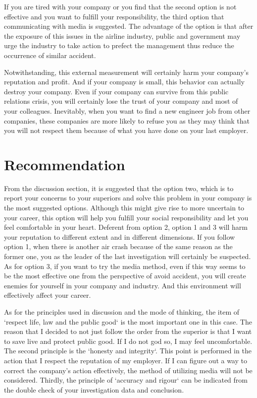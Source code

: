 \documentclass[11pt, a4paper]{article}
\begin{document}
If you are tired with your company or you find that the second option is not effective and you want to fulfill your responsibility, the third option that communicating with media is suggested. The advantage of the option is that after the exposure of this issues in the airline industry, public and government may urge the industry to take action to prefect the management thus reduce the occurrence of similar accident. 

Notwithstanding, this external measurement will certainly harm your company's reputation and profit. And if your company is small, this behavior can actually destroy your company. Even if your company can survive from this public relations crisis, you will certainly lose the trust of your company and most of your colleagues. Inevitably, when you want to find a new engineer job from other companies, these companies are more likely to refuse you as they may think that you will not respect them because of what you have done on your last employer.

\section{Recommendation}

From the discussion section, it is suggested that the option two, which is to report your concerns to your superiors and solve this problem in your company is the most suggested options. Although this might give rise to more uncertain to your career, this option will help you fulfill your social responsibility and let you feel comfortable in your heart. Deferent from option 2, option 1 and 3 will harm your reputation to different extent and in different dimensions. If you follow option 1, when there is another air crash because of the same reason as the former one, you as the leader of the last investigation will certainly be suspected. As for option 3, if you want to try the media method, even if this way seems to be the most effective one from the perspective of avoid accident, you will create enemies for yourself in your company and industry. And this environment will effectively affect your career.

As for the principles used in discussion and the mode of thinking, the item of `respect life, law and the public good` is the most important one in this case. The reason that I decided to not just follow the order from the superior is that I want to save live and protect public good. If I do not god so, I may feel uncomfortable. The second principle is the `honesty and integrity`. This point is performed in the action that I respect the reputation of my employer. If I can figure out a way to correct the company's action effectively, the method of utilizing media will not be considered. Thirdly, the principle of `accuracy and rigour` can be indicated from the double check of your investigation data and conclusion.
 



\newpage
\end{document}
